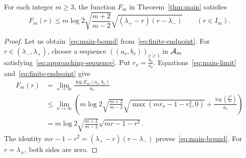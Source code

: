 \begin{corollary}\label{cor:upper-bound}
For each integer $m\ge3$, the function $F_m$ in
Theorem~\ref{thm:main} satisfies
\begin{equation}\label{eq:main-bound}
 F_m(r)\le m\log2\sqrt{\frac{m+2}{m-2}}
       \sqrt{(\lambda_+-r)(r-\lambda_-)}
       \qquad(r\in I_m).
\end{equation}
\end{corollary}
\begin{proof}
Let us obtain~\eqref{eq:main-bound} from~\eqref{eq:finite-endpoint}.
For $r\in(\lambda_-,\lambda_+)$, choose a sequence $((a_\nu,b_\nu))_{\nu\ge1}$ in $\mathcal A_m$ satisfying~\eqref{eq:approaching-sequence}.
Put $r_\nu=\frac{b_\nu}{a_\nu}$. Equations~\eqref{eq:main-limit} and~\eqref{eq:finite-endpoint} give
\[
 \begin{aligned}
 F_m(r)
 &=\lim_{\nu\to\infty}\frac{\log E_m(a_\nu,b_\nu)}{a_\nu}\\
 &\le\lim_{\nu\to\infty}\left(
 m\log2\sqrt{\frac{m+2}{m-2}}\sqrt{\max(mr_\nu-1-r_\nu^2,0)}
 +\frac{\log(\frac{2^m}{m})}{a_\nu}\right)\\
 &=m\log2\sqrt{\frac{m+2}{m-2}}\sqrt{mr-1-r^2}.
 \end{aligned}
\]
The identity $mr-1-r^2=(\lambda_+-r)(r-\lambda_-)$ proves~\eqref{eq:main-bound}.
For $r=\lambda_\pm$, both sides are zero.
\end{proof}

